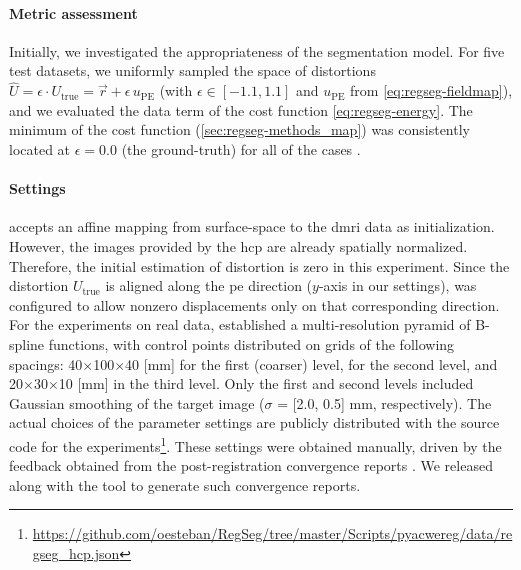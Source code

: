 \paragraph*{Metric assessment}
Initially, we investigated the appropriateness of the segmentation model.
For five test datasets, we uniformly sampled the space of distortions
  $\hat{U} = \epsilon \cdot U_\text{true} = \vec{r} + \epsilon \, u_\text{PE}$
  (with $\epsilon \in [-1.1, 1.1]$ and $u_\text{PE}$ from \eqref{eq:regseg-fieldmap}),
  and we evaluated the data term of the cost function \eqref{eq:regseg-energy}.
The minimum of the cost function (\autoref{sec:regseg-methods_map}) was consistently located at
  $\epsilon=0.0$ (the ground-truth) for all of the cases .

\paragraph*{Settings} %
\Regseg{} accepts an affine mapping from surface-space to the \gls*{dmri} data as initialization.
However, the images provided by the \gls*{hcp} are already spatially normalized.
Therefore, the initial estimation of distortion is zero in this experiment.
Since the distortion $U_\text{true}$ is aligned along the \gls*{pe} direction ($y$-axis in our settings),
  \regseg{} was configured to allow nonzero displacements only on that corresponding direction.
For the experiments on real data, \regseg{} established a multi-resolution pyramid of
  B-spline functions, with control points distributed on grids of the following spacings:
  40$\times$100$\times$40 [mm] for the first (coarser) level,  for the second level,
  and 20$\times$30$\times$10 [mm] in the third level.
Only the first and second levels included Gaussian smoothing of the target image ($\sigma$ = [2.0, 0.5] mm,
  respectively).
The actual choices of the parameter settings are publicly distributed with the source code for the
  experiments\footnote{\url{https://github.com/oesteban/RegSeg/tree/master/Scripts/pyacwereg/data/regseg_hcp.json}}.
These settings were obtained manually, driven by the feedback obtained from the post-registration
  convergence reports .
We released \regseg{} along with the tool to generate such convergence reports.

